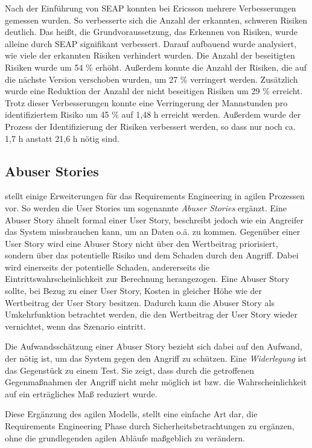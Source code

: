 Nach der Einführung von SEAP konnten bei Ericsson mehrere Verbesserungen gemessen wurden.
So verbesserte sich die Anzahl der erkannten, schweren Risiken deutlich. 
Das heißt, die Grundvoraussetzung, das Erkennen von Risiken, wurde alleine durch SEAP signifikant verbessert.
Darauf aufbauend wurde analysiert, wie viele der erkannten Risiken verhindert wurden.
Die Anzahl der beseitigten Risiken wurde um 54 \% erhöht.
Außerdem konnte die Anzahl der Risiken, die auf die nächste Version verschoben wurden, um 27 \% verringert werden.
Zusätzlich wurde eine Reduktion der Anzahl der nicht beseitigen Risiken um 29 \% erreicht.
Trotz dieser Verbesserungen konnte eine Verringerung der Mannstunden pro identifiziertem Risiko um 45 \% auf 1,48 h erreicht werden.
Außerdem wurde der Prozess der Identifizierung der Risiken verbessert werden, so dass nur noch ca. 1,7 h anstatt 21,6 h nötig sind.

\subsection{Abuser Stories} 

\parencite[][]{peeters2005agile} stellt einige Erweiterungen für das Requirements Engineering in agilen Prozessen vor.
So werden die User Stories um sogenannte \emph{Abuser Stories} ergänzt.
Eine Abuser Story ähnelt formal einer User Story, beschreibt jedoch wie ein Angreifer das System missbrauchen kann, um an Daten o.ä. zu kommen.
Gegenüber einer User Story wird eine Abuser Story nicht über den Wertbeitrag priorisiert, sondern über das potentielle Risiko und dem Schaden durch den Angriff.
Dabei wird einerseits der potentielle Schaden, andererseits die Eintrittswahrscheinlichkeit zur Berechnung herangezogen.
Eine Abuser Story sollte, bei Bezug zu einer User Story, Kosten in gleicher Höhe wie der Wertbeitrag der User Story besitzen.
Dadurch kann die Abuser Story als Umkehrfunktion betrachtet werden, die den Wertbeitrag der User Story wieder vernichtet, wenn das Szenario eintritt.

Die Aufwandsschätzung einer Abuser Story bezieht sich dabei auf den Aufwand, der nötig ist, um das System gegen den Angriff zu schützen.
Eine \emph{Widerlegung} ist das Gegenstück zu einem Test. 
Sie zeigt, dass durch die getroffenen Gegenmaßnahmen der Angriff nicht mehr möglich ist bzw. die Wahrscheinlichkeit auf ein erträgliches Maß reduziert wurde.

Diese Ergänzung des agilen Modells, stellt eine einfache Art dar, die Requirements Engineering Phase durch Sicherheitsbetrachtungen zu ergänzen, ohne die grundlegenden agilen Abläufe maßgeblich zu verändern.

